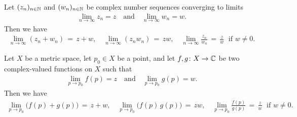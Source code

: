 \begin{lemma}
  \label{lem:complex_limit_properties}
  Let $(z_n)_{n \in \mathbb{N}}$ and $(w_n)_{n \in \mathbb{N}}$
  be complex number sequences converging to limits
  \begin{align*}
    \lim_{n \to \infty} z_n = z
    \quad \text{and} \quad
    \lim_{n \to \infty} w_n = w .
  \end{align*}
  Then we have
  \begin{align*}
    \lim_{n \to \infty} (z_n + w_n) \, = \, z + w ,
    \quad
    \lim_{n \to \infty} (z_n w_n) \, = \, z w ,
    \quad
    \lim_{n \to \infty} \frac{z_n}{w_n} \, = \, \frac{z}{w}
    \; \text{ if $w \ne 0$}.
  \end{align*}

  Let $X$ be a metric space, let $p_0 \in X$
  be a point, and let $f,g \colon X \to \mathbb{C}$
  be two complex-valued functions on $X$ such that
  \begin{align*}
    \lim_{p \to p_0} f(p) = z
    \quad \text{and} \quad
    \lim_{p \to p_0} g(p) = w .
  \end{align*}
  Then we have
  \begin{align*}
    \lim_{p \to p_0} \big( f(p) + g(p) \big) \, = \, z + w ,
    \quad
    \lim_{p \to p_0} \big( f(p) \, g(p) \big) \, = \, z w ,
    \quad
    \lim_{p \to p_0} \frac{f(p)}{g(p)} \, = \, \frac{z}{w}
    \; \text{ if $w \ne 0$}.
  \end{align*}
\end{lemma}
